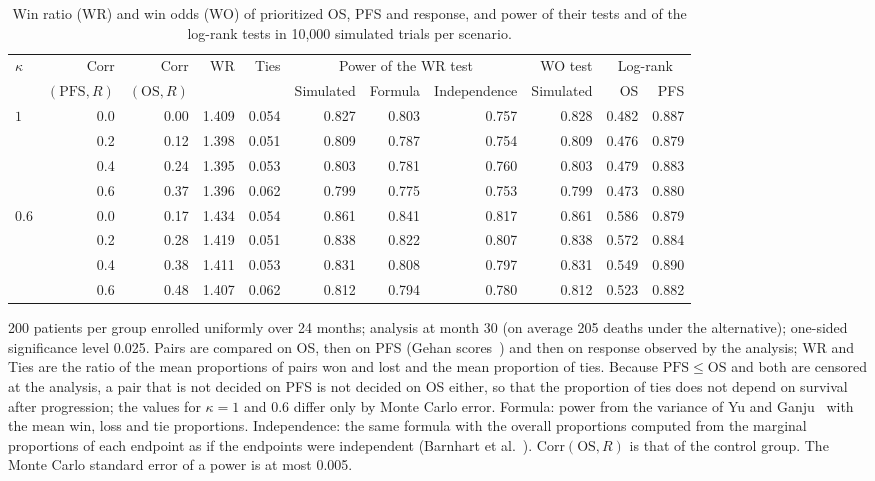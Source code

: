 \begin{table}[htbp]
\centering
\caption{Win ratio (WR) and win odds (WO) of prioritized OS, PFS and response, and power of their tests and of the log-rank tests in 10,000 simulated trials per scenario.}
\label{tab:win}
\begin{threeparttable}
\footnotesize
\begin{tabular}{lrrrrrrrrrr}
\toprule
$\kappa$ & $\mathrm{Corr}$ & $\mathrm{Corr}$ & WR & Ties & \multicolumn{3}{c}{Power of the WR test} & WO test & \multicolumn{2}{c}{Log-rank} \\
\cmidrule(lr){6-8} \cmidrule(lr){10-11}
 & $(\mathrm{PFS}, R)$ & $(\mathrm{OS}, R)$ & & & Simulated & Formula & Independence & Simulated & OS & PFS \\
\midrule
$1$ & 0.0 & 0.00 & 1.409 & 0.054 & 0.827 & 0.803 & 0.757 & 0.828 & 0.482 & 0.887 \\
 & 0.2 & 0.12 & 1.398 & 0.051 & 0.809 & 0.787 & 0.754 & 0.809 & 0.476 & 0.879 \\
 & 0.4 & 0.24 & 1.395 & 0.053 & 0.803 & 0.781 & 0.760 & 0.803 & 0.479 & 0.883 \\
 & 0.6 & 0.37 & 1.396 & 0.062 & 0.799 & 0.775 & 0.753 & 0.799 & 0.473 & 0.880 \\
\midrule
$0.6$ & 0.0 & 0.17 & 1.434 & 0.054 & 0.861 & 0.841 & 0.817 & 0.861 & 0.586 & 0.879 \\
 & 0.2 & 0.28 & 1.419 & 0.051 & 0.838 & 0.822 & 0.807 & 0.838 & 0.572 & 0.884 \\
 & 0.4 & 0.38 & 1.411 & 0.053 & 0.831 & 0.808 & 0.797 & 0.831 & 0.549 & 0.890 \\
 & 0.6 & 0.48 & 1.407 & 0.062 & 0.812 & 0.794 & 0.780 & 0.812 & 0.523 & 0.882 \\
\bottomrule
\end{tabular}
\begin{tablenotes}
\footnotesize
\item 200 patients per group enrolled uniformly over 24 months; analysis at month 30 (on average 205 deaths under the alternative); one-sided significance level 0.025. Pairs are compared on OS, then on PFS (Gehan scores~\cite{Gehan1965}) and then on response observed by the analysis; WR and Ties are the ratio of the mean proportions of pairs won and lost and the mean proportion of ties. Because $\mathrm{PFS} \le \mathrm{OS}$ and both are censored at the analysis, a pair that is not decided on PFS is not decided on OS either, so that the proportion of ties does not depend on survival after progression; the values for $\kappa = 1$ and 0.6 differ only by Monte Carlo error. Formula: power from the variance of Yu and Ganju~\cite{Yu2022} with the mean win, loss and tie proportions. Independence: the same formula with the overall proportions computed from the marginal proportions of each endpoint as if the endpoints were independent (Barnhart et al.~\cite{Barnhart2025}). $\mathrm{Corr}(\mathrm{OS}, R)$ is that of the control group. The Monte Carlo standard error of a power is at most 0.005.
\end{tablenotes}
\end{threeparttable}
\end{table}
